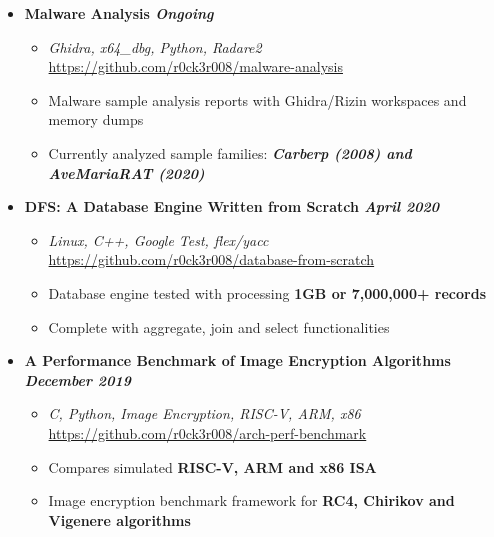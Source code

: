 \documentclass[9]{Resume}
\begin{document}
\begin{itemize}[noitemsep,nolistsep]
    \item[]\textbf{Malware Analysis \hfill \textit{Ongoing}}
        \begin{itemize}[leftmargin=*]
            \setlength\itemsep{-0.25em}
            \item[\textbullet]\textit{Ghidra, x64\_dbg, Python, Radare2} \hfill \href{https://github.com/r0ck3r008/malware-analysis}{{\scriptsize https://github.com/r0ck3r008/malware-analysis}}
            \item[\textbullet]Malware sample analysis reports with Ghidra/Rizin workspaces and memory dumps
            \item[\textbullet]Currently analyzed sample families: \textbf{\textit{Carberp (2008) and AveMariaRAT (2020)}}
        \end{itemize}

    \item[]\textbf{DFS: A Database Engine Written from Scratch \hfill \textit{April 2020}}
        \begin{itemize}[leftmargin=*]
            \setlength\itemsep{-0.25em}
            \item[\textbullet]\textit{Linux, C++, Google Test, flex/yacc} \hfill \href{https://github.com/r0ck3r008/database-from-scratch}{{\scriptsize https://github.com/r0ck3r008/database-from-scratch}}
            \item[\textbullet]Database engine tested with processing \textbf{1GB or 7,000,000+ records}
            \item[\textbullet]Complete with aggregate, join and select functionalities
        \end{itemize}

    \item[]\textbf{A Performance Benchmark of Image Encryption Algorithms \hfill \textit{December 2019}}
        \begin{itemize}[leftmargin=*]
            \setlength\itemsep{-0.25em}
            \item[\textbullet]\textit{C, Python, Image Encryption, RISC-V, ARM, x86} \hfill \href{https://github.com/r0ck3r008/arch-perf-benchmark}{{\scriptsize https://github.com/r0ck3r008/arch-perf-benchmark}}
            \item[\textbullet]Compares simulated \textbf{RISC-V, ARM and x86 ISA}
            \item[\textbullet]Image encryption benchmark framework for \textbf{RC4, Chirikov and Vigenere algorithms}
        \end{itemize}


\end{itemize}
\end{document}
